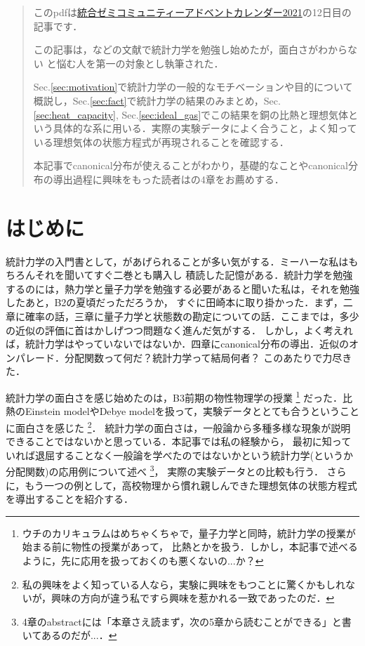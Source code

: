 \begin{abstract}
    このpdfは\href{https://adventar.org/calendars/6268}{統合ゼミコミュニティーアドベントカレンダー2021}の12日目の記事です．
    
    この記事は，\cite{Tasaki_statmech}などの文献で統計力学を勉強し始めたが，面白さがわからない
    と悩む人を第一の対象とし執筆された．
	
	Sec.\ref{sec:motivation}で統計力学の一般的なモチベーションや目的について概説し，Sec.\ref{sec:fact}で統計力学の結果のみまとめ，Sec.\ref{sec:heat_capacity}, Sec.\ref{sec:ideal_gas}でこの結果を銅の比熱と理想気体という具体的な系に用いる．実際の実験データによく合うこと，よく知っている理想気体の状態方程式が再現されることを確認する．

	本記事でcanonical分布が使えることがわかり，基礎的なことやcanonical分布の導出過程に興味をもった読者は\cite{Tasaki_statmech}の4章をお薦めする．
\end{abstract}
\section{はじめに}
    統計力学の入門書として，\cite{Tasaki_statmech}があげられることが多い気がする．ミーハーな私はもちろんそれを聞いてすぐ二巻とも購入し
    積読した記憶がある．統計力学を勉強するのには，熱力学と量子力学を勉強する必要があると聞いた私は，それを勉強したあと，B2の夏頃だっただろうか，
    すぐに田崎本に取り掛かった．まず，二章に確率の話，三章に量子力学と状態数の勘定についての話．ここまでは，多少の近似の評価に首はかしげつつ問題なく進んだ気がする．
    しかし，よく考えれば，統計力学はやっていないではないか．四章にcanonical分布の導出．近似のオンパレード．分配関数って何だ？統計力学って結局何者？
    このあたりで力尽きた．

    統計力学の面白さを感じ始めたのは，B3前期の物性物理学の授業
    \footnote{ウチのカリキュラムはめちゃくちゃで，量子力学と同時，統計力学の授業が始まる前に物性の授業があって，
    比熱とかを扱う．しかし，本記事で述べるように，先に応用を扱っておくのも悪くないの...か？}
    だった．比熱のEinstein modelやDebye modelを扱って，実験データととても合うということに面白さを感じた
	\footnote{
			私の興味をよく知っている人なら，実験に興味をもつことに驚くかもしれないが，興味の方向が違う私ですら興味を惹かれる一致であったのだ．
	}．
    統計力学の面白さは，一般論から多種多様な現象が説明できることではないかと思っている．本記事では私の経験から，
    最初に知っていれば退屈することなく一般論を学べたのではないかという統計力学(というか分配関数)の応用例について述べ
	\footnote{
			\cite{Tasaki_statmech}4章のabstractには「本章さえ読まず，次の5章から読むことができる」と書いてあるのだが...．
	}，
    実際の実験データ\cite{doi:10.1063/1.555728}との比較も行う．
	さらに，もう一つの例として，高校物理から慣れ親しんできた理想気体の状態方程式を導出することを紹介する．


